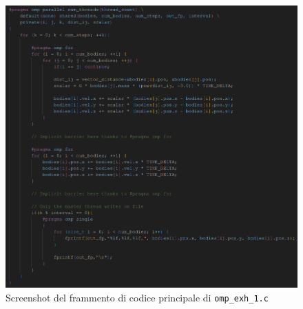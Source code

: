 \documentclass[12pt]{report}
\begin{document}
    \begin{figure}[H]
        \centering
        \includegraphics[width=\textwidth]{images/omp_exh_1.png}
        \caption{Screenshot del frammento di codice principale di \texttt{omp\_exh\_1.c}}
        \label{fig:omp_exh_1}
    \end{figure}
\end{document}
